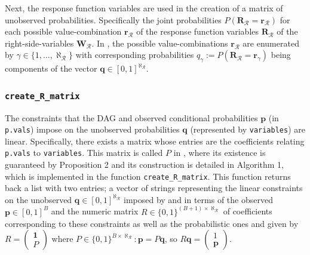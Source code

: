 Next, the response function variables are used in the creation of a matrix of unobserved probabilities. Specifically the joint probabilities \(P(\mathbf{R}_\mathcal{R}=\mathbf{r}_\mathcal{R})\) for each possible value-combination \(\mathbf{r}_\mathcal{R}\) of the response function variables \(\mathbf{R}_\mathcal{R}\) of the right-side-variables \(\mathbf{W}_\mathcal{R}\). In \citet{generalcausalbounds}, the possible value-combinations \(\mathbf{r}_\mathcal{R}\) are enumerated by \(\gamma\in\{1,\dots,\aleph_\mathcal{R}\}\) with corresponding probabilities \(q_\gamma:=P(\mathbf{R}_\mathcal{R}=\mathbf{r}_\gamma)\) being components of the vector \(\mathbf{q}\in[0,1]^{\aleph_\mathcal{R}}\).

\hypertarget{create_r_matrix}{%
\subsubsection{\texorpdfstring{\texttt{create\_R\_matrix}}{create\_R\_matrix}}\label{create_r_matrix}}

The constraints that the DAG and observed conditional probabilities \(\mathbf{p}\) (in \texttt{p.vals}) impose on the unobserved probabilities \(\mathbf{q}\) (represented by \texttt{variables}) are linear.
Specifically, there exists a matrix whose entries are the coefficients relating \texttt{p.vals} to \texttt{variables}. This matrix is called \(P\) in \citet{generalcausalbounds}, where its existence is guaranteed by Proposition 2 and its construction is detailed in Algorithm 1, which is implemented in the function \texttt{create\_R\_matrix}. This function returns back a list with two entries; a vector of strings representing the linear constraints on the unobserved \(\mathbf{q}\in[0,1]^{\aleph_\mathcal{R}}\) imposed by and in terms of the observed \(\mathbf{p}\in[0,1]^B\) and the numeric matrix \(R\in\{0,1\}^{(B+1)\times\aleph_\mathcal{R}}\) of coefficients corresponding to these constraints as well as the probabilistic ones and given by \(R=\begin{pmatrix}\mathbf{1}\\P\end{pmatrix}\) where \(P\in\{0,1\}^{B\times\aleph_\mathcal{R}}:\mathbf{p}=P\mathbf{q}\), so \(R\mathbf{q}=\begin{pmatrix}1\\\mathbf{p}\end{pmatrix}\).

